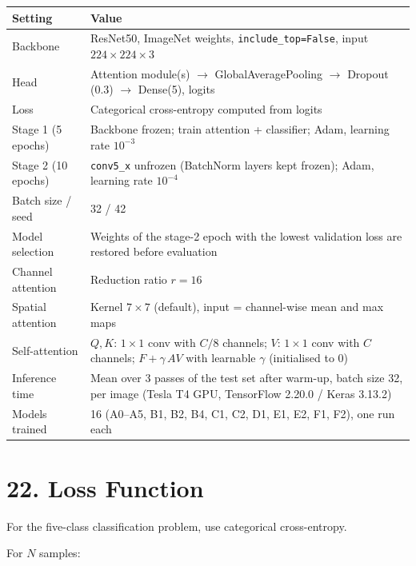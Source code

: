 \documentclass[10pt]{article}
\begin{document}
\begin{center}
\begin{tabular}{|l|p{10.5cm}|}
\hline
\textbf{Setting} & \textbf{Value} \\
\hline
Backbone & ResNet50, ImageNet weights, \texttt{include\_top=False}, input $224\times224\times3$ \\
\hline
Head & Attention module(s) $\rightarrow$ GlobalAveragePooling $\rightarrow$ Dropout (0.3) $\rightarrow$ Dense(5), logits \\
\hline
Loss & Categorical cross-entropy computed from logits \\
\hline
Stage 1 (5 epochs) & Backbone frozen; train attention + classifier; Adam, learning rate $10^{-3}$ \\
\hline
Stage 2 (10 epochs) & \texttt{conv5\_x} unfrozen (BatchNorm layers kept frozen); Adam, learning rate $10^{-4}$ \\
\hline
Batch size / seed & 32 / 42 \\
\hline
Model selection & Weights of the stage-2 epoch with the lowest validation loss are restored before evaluation \\
\hline
Channel attention & Reduction ratio $r=16$ \\
\hline
Spatial attention & Kernel $7\times7$ (default), input = channel-wise mean and max maps \\
\hline
Self-attention & $Q,K$: $1\times1$ conv with $C/8$ channels; $V$: $1\times1$ conv with $C$ channels; $F+\gamma\,AV$ with learnable $\gamma$ (initialised to 0) \\
\hline
Inference time & Mean over 3 passes of the test set after warm-up, batch size 32, per image (Tesla T4 GPU, TensorFlow 2.20.0 / Keras 3.13.2) \\
\hline
Models trained & 16 (A0--A5, B1, B2, B4, C1, C2, D1, E1, E2, F1, F2), one run each \\
\hline
\end{tabular}
\end{center}

\section*{22. Loss Function}

For the five-class classification problem, use categorical cross-entropy.

For $N$ samples:
\end{document}
